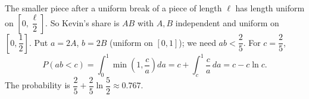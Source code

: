 The smaller piece after a uniform break of a piece of length $\ell$ has length uniform on $\left[0,\dfrac\ell2\right]$. So Kevin's share is $AB$ with $A,B$ independent and uniform on $\left[0,\dfrac12\right]$. Put $a=2A$, $b=2B$ (uniform on $[0,1]$); we need $ab<\dfrac25$. For $c=\dfrac25$,
\[P(ab<c)=\int_0^1\min\left(1,\dfrac ca\right)da=c+\int_c^1\dfrac ca\,da=c-c\ln c.\]
The probability is $\boxed{\dfrac25+\dfrac25\ln\dfrac52}\approx0.767$.
